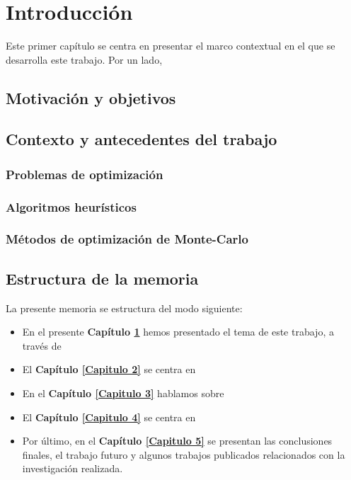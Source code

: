 \chapter{Introducción} \label{Capitulo 1}
Este primer capítulo se centra en presentar el marco contextual en el que se desarrolla este trabajo. Por un lado, 

\section{Motivación y objetivos}


\section{Contexto y antecedentes del trabajo}

\cite{8903465}

\subsection{Problemas de optimización}

\subsection{Algoritmos heurísticos}

\subsection{Métodos de optimización de Monte-Carlo}



\section{Estructura de la memoria}
La presente memoria se estructura del modo siguiente:

\begin{itemize}

\item En el presente \textbf{Capítulo \ref{Capitulo 1}} hemos presentado el tema de este trabajo, a través de 

\item El \textbf{Capítulo \ref{Capitulo 2}} se centra en 

\item En el \textbf{Capítulo \ref{Capitulo 3}} hablamos sobre  

\item El \textbf{Capítulo \ref{Capitulo 4}} se centra en 

\item Por último, en el \textbf{Capítulo \ref{Capitulo 5}} se presentan las conclusiones finales, el trabajo futuro y algunos trabajos publicados relacionados con la investigación realizada.

\end{itemize}

